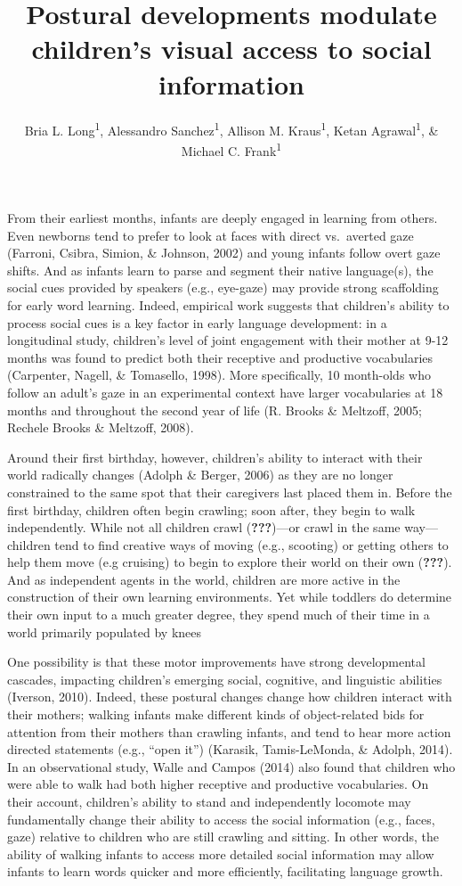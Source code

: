 \documentclass[english,man,floatsintext,draftall]{apa6}
\author{Bria L. Long\textsuperscript{1}, Alessandro Sanchez\textsuperscript{1}, Allison M. Kraus\textsuperscript{1}, Ketan Agrawal\textsuperscript{1}, \& Michael C. Frank\textsuperscript{1}}
\affiliation{
\vspace{0.5cm}
\textsuperscript{1} Department of Psychology, Stanford University}
\title{Postural developments modulate children's visual access to social
information}
\date{}
\begin{document}
\maketitle

From their earliest months, infants are deeply engaged in learning from
others. Even newborns tend to prefer to look at faces with direct
vs.~averted gaze (Farroni, Csibra, Simion, \& Johnson, 2002) and young
infants follow overt gaze shifts. And as infants learn to parse and
segment their native language(s), the social cues provided by speakers
(e.g., eye-gaze) may provide strong scaffolding for early word learning.
Indeed, empirical work suggests that children's ability to process
social cues is a key factor in early language development: in a
longitudinal study, children's level of joint engagement with their
mother at 9-12 months was found to predict both their receptive and
productive vocabularies (Carpenter, Nagell, \& Tomasello, 1998). More
specifically, 10 month-olds who follow an adult's gaze in an
experimental context have larger vocabularies at 18 months and
throughout the second year of life (R. Brooks \& Meltzoff, 2005; Rechele
Brooks \& Meltzoff, 2008).

Around their first birthday, however, children's ability to interact
with their world radically changes (Adolph \& Berger, 2006) as they are
no longer constrained to the same spot that their caregivers last placed
them in. Before the first birthday, children often begin crawling; soon
after, they begin to walk independently. While not all children crawl
({\textbf{???}})---or crawl in the same way---children tend to find
creative ways of moving (e.g., scooting) or getting others to help them
move (e.g cruising) to begin to explore their world on their own
({\textbf{???}}). And as independent agents in the world, children are
more active in the construction of their own learning environments. Yet
while toddlers do determine their own input to a much greater degree,
they spend much of their time in a world primarily populated by knees

One possibility is that these motor improvements have strong
developmental cascades, impacting children's emerging social, cognitive,
and linguistic abilities (Iverson, 2010). Indeed, these postural changes
change how children interact with their mothers; walking infants make
different kinds of object-related bids for attention from their mothers
than crawling infants, and tend to hear more action directed statements
(e.g., \enquote{open it}) (Karasik, Tamis-LeMonda, \& Adolph, 2014). In
an observational study, Walle and Campos (2014) also found that children
who were able to walk had both higher receptive and productive
vocabularies. On their account, children's ability to stand and
independently locomote may fundamentally change their ability to access
the social information (e.g., faces, gaze) relative to children who are
still crawling and sitting. In other words, the ability of walking
infants to access more detailed social information may allow infants to
learn words quicker and more efficiently, facilitating language growth.
\end{document}
